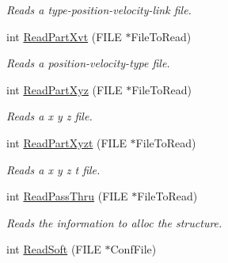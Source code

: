 \begin{DoxyCompactItemize}
\begin{DoxyCompactList}\small\item\em \-Reads a type-\/position-\/velocity-\/link file. \end{DoxyCompactList}\item 
\hypertarget{classVarData_af68e28e4d062221c6e1dec3cbdf9d273}{int \hyperlink{classVarData_af68e28e4d062221c6e1dec3cbdf9d273}{\-Read\-Part\-Xvt} (\-F\-I\-L\-E $\ast$\-File\-To\-Read)}\label{classVarData_af68e28e4d062221c6e1dec3cbdf9d273}

\begin{DoxyCompactList}\small\item\em \-Reads a position-\/velocity-\/type file. \end{DoxyCompactList}\item 
\hypertarget{classVarData_a666fd63d49f1f11aad0e802f23b2c9e4}{int \hyperlink{classVarData_a666fd63d49f1f11aad0e802f23b2c9e4}{\-Read\-Part\-Xyz} (\-F\-I\-L\-E $\ast$\-File\-To\-Read)}\label{classVarData_a666fd63d49f1f11aad0e802f23b2c9e4}

\begin{DoxyCompactList}\small\item\em \-Reads a x y z file. \end{DoxyCompactList}\item 
\hypertarget{classVarData_ab2229d507a00306836dfbdafa7a61bad}{int \hyperlink{classVarData_ab2229d507a00306836dfbdafa7a61bad}{\-Read\-Part\-Xyzt} (\-F\-I\-L\-E $\ast$\-File\-To\-Read)}\label{classVarData_ab2229d507a00306836dfbdafa7a61bad}

\begin{DoxyCompactList}\small\item\em \-Reads a x y z t file. \end{DoxyCompactList}\item 
\hypertarget{classVarData_a189598b2b9b9d99be1e12d720e2a4426}{int \hyperlink{classVarData_a189598b2b9b9d99be1e12d720e2a4426}{\-Read\-Pass\-Thru} (\-F\-I\-L\-E $\ast$\-File\-To\-Read)}\label{classVarData_a189598b2b9b9d99be1e12d720e2a4426}

\begin{DoxyCompactList}\small\item\em \-Reads the information to alloc the structure. \end{DoxyCompactList}\item 
\hypertarget{classVarData_a9c617ac56900ea72944af62fc4befdca}{int \hyperlink{classVarData_a9c617ac56900ea72944af62fc4befdca}{\-Read\-Soft} (\-F\-I\-L\-E $\ast$\-Conf\-File)}\label{classVarData_a9c617ac56900ea72944af62fc4befdca}


\end{DoxyCompactItemize}
